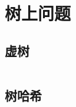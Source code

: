 \section{树上问题}
				\subsection{虚树}
					\inputminted{cpp}{src/TreeandGraph/虚树.cpp}
				\subsection{树哈希}
					\inputminted{cpp}{src/TreeandGraph/TreeHash.cpp}
